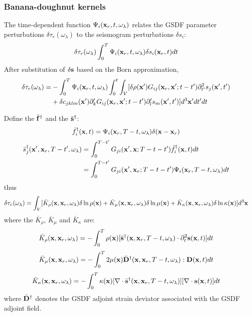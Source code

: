 \subsubsection{Banana-doughnut kernels}
The time-dependent function $\Psi_i(\mathbf{x}_r,t,\omega_\lambda)$ relates the GSDF parameter perturbations $\delta\tau_r(\omega_\lambda)$ to the seismogram perturbations $\delta s_i$:
\[ \delta\tau_r(\omega_\lambda)\int_0^T\Psi_i(\mathbf{x}_r,t,\omega_\lambda)\delta s_i(\mathbf{x}_r,t)dt \]
After substitution of $\delta\mathbf{s}$ based on the Born approximation,
\begin{align*}
  \delta\tau_r(\omega_\lambda)= & -\int_0^T\Psi_i(\mathbf{x}_r,t,\omega_\lambda)\int_0^t\int_V[\delta\rho(\mathbf{x}')G_{ij}(\mathbf{x}_r,\mathbf{x}';t-t')\partial_{t'}^2s_j(\mathbf{x}',t') \\
    & +\delta c_{jklm}(\mathbf{x}')\partial_k^\prime G_{ij}(\mathbf{x}_r,\mathbf{x}';t-t')\partial_l^\prime s_m(\mathbf{x}',t')]d^3\mathbf{x}'dt'dt
\end{align*}\par
Define the  $\bar{\mathbf{f}}^\dagger$ and the  $\bar{\mathbf{s}}^\dagger$:
\[ \bar f_i^\dagger(\mathbf{x},t)=\Psi_i(\mathbf{x}_r,T-t,\omega_\lambda)\delta(\mathbf{x}-\mathbf{x}_r) \]
\begin{align*}
  \bar s_j^\dagger(\mathbf{x}',\mathbf{x}_r,T-t',\omega_\lambda) & =\int_0^{T-t'}G_{ji}(\mathbf{x}',\mathbf{x};T-t-t')\bar f_i^\dagger(\mathbf{x},t)dt \\
    & =\int_0^{T-t'}G_{ji}(\mathbf{x}',\mathbf{x}_r;T-t-t')\Psi_i(\mathbf{x}_r,T-t,\omega_\lambda)dt
\end{align*}
thus
\[ \delta\tau_r(\omega_\lambda)=\int_V[\bar K_\rho(\mathbf{x},\mathbf{x}_r,\omega_\lambda)\delta\ln\rho(\mathbf{x})+\bar K_\mu(\mathbf{x},\mathbf{x}_r,\omega_\lambda)\delta\ln\mu(\mathbf{x})+\bar K_\kappa(\mathbf{x},\mathbf{x}_r,\omega_\lambda)\delta\ln\kappa(\mathbf{x})]d^3\mathbf{x} \]
where the  $\bar K_\rho$, $\bar K_\mu$ and $\bar K_\kappa$ are:
\[ \bar K_\rho(\mathbf{x},\mathbf{x}_r,\omega_\lambda)=-\int_0^T\rho(\mathbf{x})[\bar{\mathbf{s}}^\dagger(\mathbf{x},\mathbf{x}_r,T-t,\omega_\lambda)\cdot\partial_t^2\mathbf{s}(\mathbf{x},t)]dt \]
\[ \bar K_\mu(\mathbf{x},\mathbf{x}_r,\omega_\lambda)=-\int_0^T2\mu(\mathbf{x})\bar{\mathbf{D}}^\dagger(\mathbf{x},\mathbf{x}_r,T-t,\omega_\lambda):\mathbf{D}(\mathbf{x},t)dt \]
\[ \bar K_\kappa(\mathbf{x},\mathbf{x}_r,\omega_\lambda)=-\int_0^T\kappa(\mathbf{x})[\nabla\cdot\bar{\mathbf{s}}^\dagger(\mathbf{x},\mathbf{x}_r,T-t,\omega_\lambda)][\nabla\cdot\mathbf{s}(\mathbf{x},t)]dt \]
where $\bar{\mathbf{D}}^\dagger$ denotes the GSDF adjoint strain deviator associated with the GSDF adjoint field.\par
